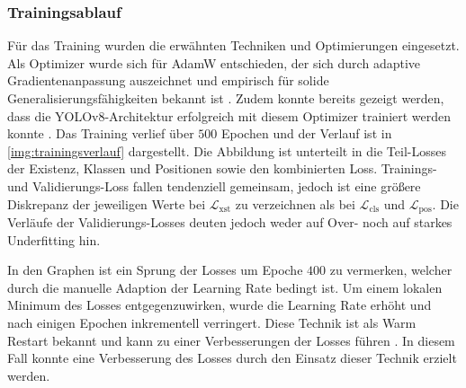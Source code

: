 
\subsubsection{Trainingsablauf}
\label{sec:trainingsverlauf}

Für das Training wurden die erwähnten Techniken und Optimierungen eingesetzt. Als Optimizer wurde sich für AdamW entschieden, der sich durch adaptive Gradientenanpassung auszeichnet und empirisch für solide Generalisierungsfähigkeiten bekannt ist \cite{adamw, adamw_good, adamw_good2, adamw_good3, adamw_good4}. Zudem konnte bereits gezeigt werden, dass die YOLOv8-Architektur erfolgreich mit diesem Optimizer trainiert werden konnte \cite{adamw_yolo}. Das Training verlief über $500$ Epochen und der Verlauf ist in \autoref{img:trainingsverlauf} dargestellt. Die Abbildung ist unterteilt in die Teil-Losses der Existenz, Klassen und Positionen sowie den kombinierten Loss. Trainings- und Validierungs-Loss fallen tendenziell gemeinsam, jedoch ist eine größere Diskrepanz der jeweiligen Werte bei $\mathcal{L}_\text{xst}$ zu verzeichnen als bei $\mathcal{L}_\text{cls}$ und $\mathcal{L}_\text{pos}$. Die Verläufe der Validierungs-Losses deuten jedoch weder auf Over- noch auf starkes Underfitting hin.

In den Graphen ist ein Sprung der Losses um Epoche $400$ zu vermerken, welcher durch die manuelle Adaption der Learning Rate bedingt ist. Um einem lokalen Minimum des Losses entgegenzuwirken, wurde die Learning Rate erhöht und nach einigen Epochen inkrementell verringert. Diese Technik ist als Warm Restart bekannt und kann zu einer Verbesserungen der Losses führen \cite{lr_warm_restart}. In diesem Fall konnte eine Verbesserung des Losses durch den Einsatz dieser Technik erzielt werden.

